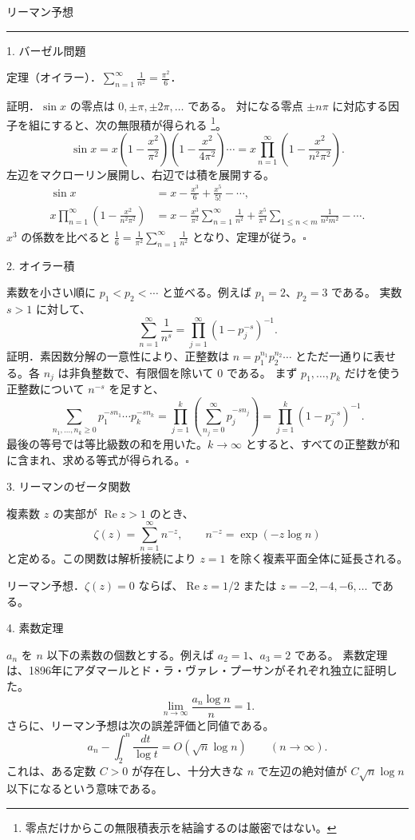 \documentclass[a4paper,10pt,pdflatex,ja=standard,jafont=ipaex-type1,
  magstyle=real,scale=1]{bxjsarticle}
\newcommand{\handouttitle}[1]{%
  \begin{center}
    {\Large\color{ink}#1}\par\vspace{3mm}
    {\color{accent}\rule{0.88\linewidth}{0.7pt}}
  \end{center}\vspace{-2mm}}
\newcommand{\topic}[1]{\par\vspace{5pt}%
  {\large\sffamily\mdseries\color{accent}#1}\par\vspace{2pt}}
\begin{document}
\fontsize{10pt}{13.5pt}\selectfont
\setlength{\abovedisplayskip}{4pt}
\setlength{\belowdisplayskip}{4pt}
\handouttitle{リーマン予想}

\topic{1. バーゼル問題}
定理（オイラー）．$\displaystyle\sum_{n=1}^{\infty}\frac{1}{n^2}=\frac{\pi^2}{6}$．

証明．$\sin x$ の零点は $0,\pm\pi,\pm2\pi,\ldots$ である。
対になる零点 $\pm n\pi$ に対応する因子を組にすると、次の無限積が得られる%
\footnote{零点だけからこの無限積表示を結論するのは厳密ではない。}。
$$
 \sin x=x\left(1-\frac{x^2}{\pi^2}\right)
 \left(1-\frac{x^2}{4\pi^2}\right)\cdots
 =x\prod_{n=1}^{\infty}\left(1-\frac{x^2}{n^2\pi^2}\right).
$$
左辺をマクローリン展開し、右辺では積を展開する。
$$
 \begin{aligned}
 \sin x
 &=x-\frac{x^3}{6}+\frac{x^5}{5!}-\cdots,\\
 x\prod_{n=1}^{\infty}\left(1-\frac{x^2}{n^2\pi^2}\right)
 &=x-\frac{x^3}{\pi^2}\sum_{n=1}^{\infty}\frac{1}{n^2}
   +\frac{x^5}{\pi^4}\sum_{1\le n<m}\frac{1}{n^2m^2}-\cdots.
 \end{aligned}
$$
$x^3$ の係数を比べると $\displaystyle\frac{1}{6}=\frac{1}{\pi^2}\sum_{n=1}^{\infty}\frac{1}{n^2}$ となり、定理が従う。\hfill$\square$

\topic{2. オイラー積}
素数を小さい順に $p_1<p_2<\cdots$ と並べる。例えば $p_1=2$、$p_2=3$ である。
実数 $s>1$ に対して、
$$
 \sum_{n=1}^{\infty}\frac{1}{n^s}
 =\prod_{j=1}^{\infty}(1-p_j^{-s})^{-1}.
$$
証明．素因数分解の一意性により、正整数は $n=p_1^{n_1}p_2^{n_2}\cdots$ とただ一通りに表せる。各 $n_j$ は非負整数で、有限個を除いて $0$ である。
まず $p_1,\ldots,p_k$ だけを使う正整数について $n^{-s}$ を足すと、
$$
 \sum_{n_1,\ldots,n_k\ge0}p_1^{-s n_1}\cdots p_k^{-s n_k}
 =\prod_{j=1}^k\left(\sum_{n_j=0}^{\infty}p_j^{-s n_j}\right)
 =\prod_{j=1}^k(1-p_j^{-s})^{-1}.
$$
最後の等号では等比級数の和を用いた。$k\to\infty$ とすると、すべての正整数が和に含まれ、求める等式が得られる。\hfill$\square$

\topic{3. リーマンのゼータ関数}
複素数 $z$ の実部が $\operatorname{Re}z>1$ のとき、
$$
 \zeta(z)=\sum_{n=1}^{\infty}n^{-z},\qquad n^{-z}=\exp(-z\log n)
$$
と定める。この関数は解析接続により $z=1$ を除く複素平面全体に延長される。

リーマン予想．$\zeta(z)=0$ ならば、$\operatorname{Re}z=1/2$ または $z=-2,-4,-6,\ldots$ である。

\topic{4. 素数定理}
$a_n$ を $n$ 以下の素数の個数とする。例えば $a_2=1$、$a_3=2$ である。
素数定理は、1896年にアダマールとド・ラ・ヴァレ・プーサンがそれぞれ独立に証明した。
$$
 \lim_{n\to\infty}\frac{a_n\log n}{n}=1.
$$
さらに、リーマン予想は次の誤差評価と同値である。
$$
 a_n-\int_2^n\frac{dt}{\log t}=O(\sqrt n\log n)\qquad(n\to\infty).
$$
これは、ある定数 $C>0$ が存在し、十分大きな $n$ で左辺の絶対値が $C\sqrt n\log n$ 以下になるという意味である。
\end{document}

